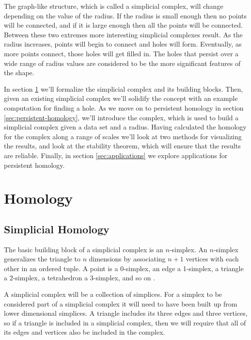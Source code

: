 The graph-like structure, which is called a simplicial complex, will change depending on the value of the radius.
If the radius is small enough then no points will be connected, and if it is large enough then all the points will be connected.
Between these two extremes more interesting simplicial complexes result.
As the radius increases, points will begin to connect and holes will form.
Eventually, as more points connect, those holes will get filled in.
The holes that persist over a wide range of radius values are considered to be the more significant features of the shape.

In section \ref{sec:homology} we'll formalize the simplicial complex and its building blocks.
Then, given an existing simplicial complex we'll solidify the concept with an example computation for finding a hole.
As we move on to persistent homology in section \ref{sec:persistent-homology}, we'll introduce the \cech complex, which is used to build a simplicial complex given a data set and a radius.
Having calculated the homology for the \cech complex along a range of scales we'll look at two methods for visualizing the results, and  look at the stability theorem, which will ensure that the results are reliable.
Finally, in section \ref{sec:applications} we  explore applications for persistent homology.

\section{Homology}\label{sec:homology}

\subsection{Simplicial Homology}\label{sec:simplicial-homology}

The basic building block of a simplicial complex is an \(n\)-simplex. %
An \(n\)-simplex generalizes the triangle to \(n\) dimensions by associating \(n+1\) vertices with each other in an ordered tuple.
A point is a 0-simplex, an edge a 1-simplex, a triangle a 2-simplex, a tetrahedron a 3-simplex, and so on .

\begin{figure}
    
    \caption{}
    \label{fig:basic-simplices}
\end{figure}

A simplicial complex will be a collection of simplices.
For a simplex to be considered part of a simplicial complex it will need to have been built up from lower dimensional simplices.
A triangle includes its three edges and three vertices, so if a triangle is included in a simplicial complex, then we will require that all of its edges and vertices also be included in the complex.

